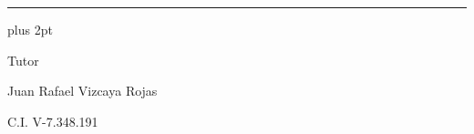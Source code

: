 \begin{titlepage}
    \vfill
    
    \begin{center}
        
        \rule{6cm}{1pt}
        
        \vspace{0.2cm}
        
        \parskip=0pt plus 2pt
        
        \begin{spacing}{1}
            Tutor
        
            Juan Rafael Vizcaya Rojas
        
            C.I. V-7.348.191
        \end{spacing}
        
    \end{center}
    
    \vspace{0.5cm}
    
    \end{titlepage}
